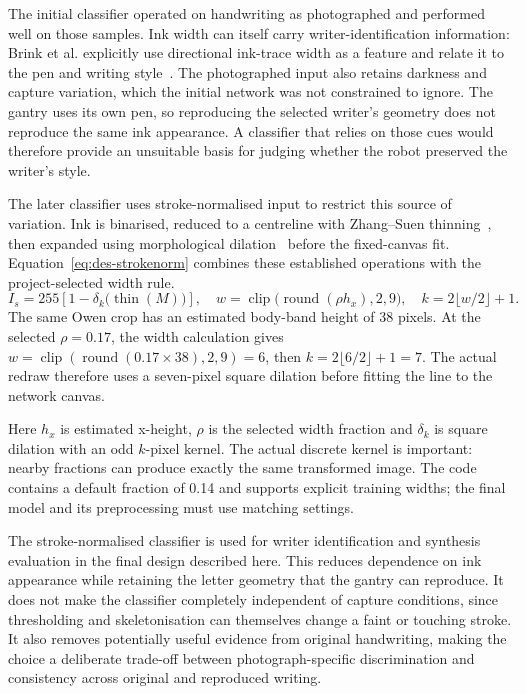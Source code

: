 The initial classifier operated on handwriting as photographed and performed well on those samples. Ink width can itself carry writer-identification information: Brink et al. explicitly use directional ink-trace width as a feature and relate it to the pen and writing style~\cite[p.~162]{brink2012}. The photographed input also retains darkness and capture variation, which the initial network was not constrained to ignore. The gantry uses its own pen, so reproducing the selected writer's geometry does not reproduce the same ink appearance. A classifier that relies on those cues would therefore provide an unsuitable basis for judging whether the robot preserved the writer's style.

The later classifier uses stroke-normalised input to restrict this source of variation. Ink is binarised, reduced to a centreline with Zhang--Suen thinning~\cite[p.~237]{zhang1984}, then expanded using morphological dilation~\cite[p.~533, Def.~1]{haralick1987} before the fixed-canvas fit. Equation~\ref{eq:des-strokenorm} combines these established operations with the project-selected width rule.
\begin{equation}
I_s=255\left[1-\delta_k\bigl(\operatorname{thin}(M)\bigr)\right],\quad
w=\operatorname{clip}\bigl(\operatorname{round}(\rho h_x),2,9\bigr),\quad
k=2\lfloor w/2\rfloor+1.
\label{eq:des-strokenorm}
\end{equation}
The same Owen crop has an estimated body-band height of 38 pixels. At the selected $\rho=0.17$, the width calculation gives $w=\operatorname{clip}(\operatorname{round}(0.17\times38),2,9)=6$, then $k=2\lfloor6/2\rfloor+1=7$. The actual redraw therefore uses a seven-pixel square dilation before fitting the line to the network canvas.

Here $h_x$ is estimated x-height, $\rho$ is the selected width fraction and $\delta_k$ is square dilation with an odd $k$-pixel kernel. The actual discrete kernel is important: nearby fractions can produce exactly the same transformed image. The code contains a default fraction of 0.14 and supports explicit training widths; the final model and its preprocessing must use matching settings.

The stroke-normalised classifier is used for writer identification and synthesis evaluation in the final design described here. This reduces dependence on ink appearance while retaining the letter geometry that the gantry can reproduce. It does not make the classifier completely independent of capture conditions, since thresholding and skeletonisation can themselves change a faint or touching stroke. It also removes potentially useful evidence from original handwriting, making the choice a deliberate trade-off between photograph-specific discrimination and consistency across original and reproduced writing.

